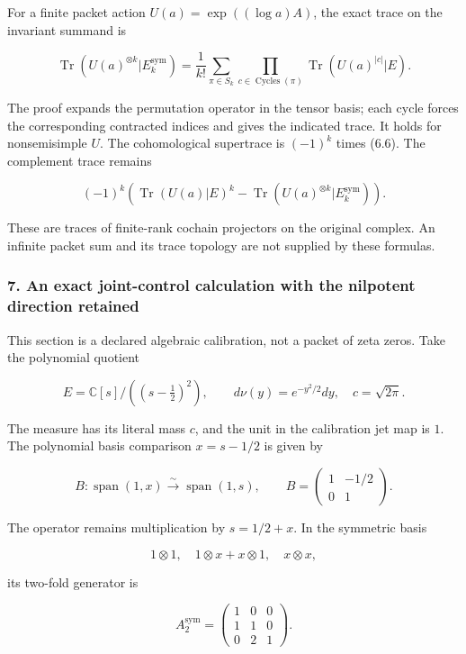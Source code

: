 For a finite packet action \(U(a)=\exp((\log a)A)\), the exact trace on
the invariant summand is

\[\boxed{\operatorname{Tr}(U(a)^{\otimes k}|E_k^{\mathrm{sym}})
=\frac1{k!}\sum_{\pi\in S_k}\prod_{c\in\operatorname{Cycles}(\pi)}
\operatorname{Tr}(U(a)^{|c|}|E).}\tag{6.6}\]

The proof expands the permutation operator in the tensor basis; each
cycle forces the corresponding contracted indices and gives the
indicated trace. It holds for nonsemisimple \(U\). The cohomological
supertrace is \((-1)^k\) times (6.6). The complement trace remains

\[(-1)^k\left(\operatorname{Tr}(U(a)|E)^k-
\operatorname{Tr}(U(a)^{\otimes k}|E_k^{\mathrm{sym}})\right).\tag{6.7}\]

These are traces of finite-rank cochain projectors on the original
complex. An infinite packet sum and its trace topology are not supplied
by these formulas.

\subsubsection{7. An exact joint-control calculation with the nilpotent
direction
retained}\label{symmetric_frontier:an-exact-joint-control-calculation-with-the-nilpotent-direction-retained}

This section is a declared algebraic calibration, not a packet of zeta
zeros. Take the polynomial quotient

\[E=\mathbb C[s]/((s-\tfrac12)^2),\qquad d\nu(y)=e^{-y^2/2}dy,\quad c=\sqrt{2\pi}.\]

The measure has its literal mass \(c\), and the unit in the calibration
jet map is \(1\). The polynomial basis comparison \(x=s-1/2\) is given
by

\[B:\operatorname{span}(1,x)\xrightarrow{\sim}\operatorname{span}(1,s),\qquad
B=\begin{pmatrix}1&-1/2\\0&1\end{pmatrix}.\tag{7.1}\]

The operator remains multiplication by \(s=1/2+x\). In the symmetric
basis

\[1\otimes1,\quad 1\otimes x+x\otimes1,\quad x\otimes x,\]

its two-fold generator is

\[A_2^{\mathrm{sym}}=\begin{pmatrix}1&0&0\\1&1&0\\0&2&1\end{pmatrix}.\tag{7.2}\]

